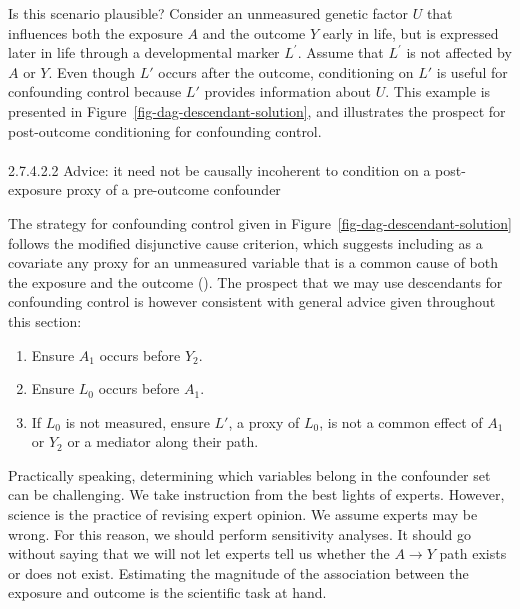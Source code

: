 \documentclass[
  singlecolumn]{article}
\makeatletter
\let\oldparagraph\paragraph
\renewcommand{\paragraph}{
    \@ifstar
      \xxxParagraphStar
      \xxxParagraphNoStar
  }
\newcommand{\xxxParagraphStar}[1]{\oldparagraph*{#1}\mbox{}}
\newcommand{\xxxParagraphNoStar}[1]{\oldparagraph{#1}\mbox{}}
\providecommand{\tightlist}{%
  \setlength{\itemsep}{0pt}\setlength{\parskip}{0pt}}\usepackage{longtable,booktabs,array}
\makeatother
\begin{document}
Is this scenario plausible? Consider an unmeasured genetic factor \(U\)
that influences both the exposure \(A\) and the outcome \(Y\) early in
life, but is expressed later in life through a developmental marker
\(L^\prime\). Assume that \(L^\prime\) is not affected by \(A\) or
\(Y\). Even though \(L'\) occurs after the outcome, conditioning on
\(L'\) is useful for confounding control because \(L'\) provides
information about \(U\). This example is presented in
Figure~\ref{fig-dag-descendant-solution}, and illustrates the prospect
for post-outcome conditioning for confounding control.

\paragraph{2.7.4.2.2 Advice: it need not be causally incoherent to
condition on a post-exposure proxy of a pre-outcome
confounder}\label{advice-it-need-not-be-causally-incoherent-to-condition-on-a-post-exposure-proxy-of-a-pre-outcome-confounder}

The strategy for confounding control given in
Figure~\ref{fig-dag-descendant-solution} follows the modified
disjunctive cause criterion, which suggests including as a covariate any
proxy for an unmeasured variable that is a common cause of both the
exposure and the outcome (). The prospect that we may use descendants for confounding control
is however consistent with general advice given throughout this section:

\begin{enumerate}
\def\labelenumi{\arabic{enumi}.}
\tightlist
\item
  Ensure \(A_1\) occurs before \(Y_2\).
\item
  Ensure \(L_0\) occurs before \(A_1\).
\item
  If \(L_0\) is not measured, ensure \(L'\), a proxy of \(L_0\), is not
  a common effect of \(A_1\) or \(Y_2\) or a mediator along their path.
\end{enumerate}

Practically speaking, determining which variables belong in the
confounder set can be challenging. We take instruction from the best
lights of experts. However, science is the practice of revising expert
opinion. We assume experts may be wrong. For this reason, we should
perform sensitivity analyses. It should go without saying that we will
not let experts tell us whether the \(A\to Y\) path exists or does not
exist. Estimating the magnitude of the association between the exposure
and outcome is the scientific task at hand.
\end{document}

